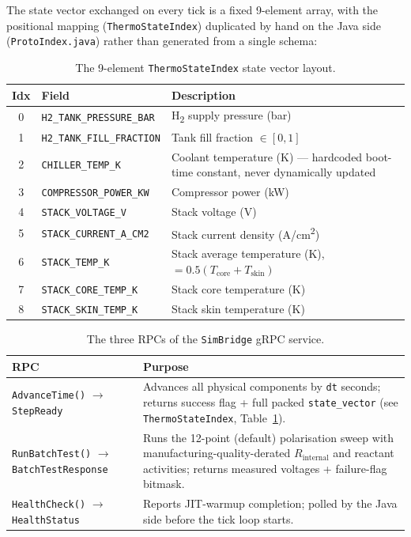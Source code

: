 \documentclass[twocolumn,10pt,a4paper]{article}
\newcommand{\code}[1]{\texttt{\small #1}}
\begin{document}
The state vector exchanged on every tick is a fixed 9-element array, with the positional mapping (\code{ThermoStateIndex}) duplicated by hand on the Java side (\code{ProtoIndex.java}) rather than generated from a single schema:

\begin{table}[t]
\centering
\small
\begin{tabular}{@{}clp{11.5cm}@{}}
\toprule
\textbf{Idx} & \textbf{Field} & \textbf{Description} \\
\midrule
0 & \code{H2\_TANK\_PRESSURE\_BAR} & H\textsubscript{2} supply pressure (bar) \\
1 & \code{H2\_TANK\_FILL\_FRACTION} & Tank fill fraction $\in [0,1]$ \\
2 & \code{CHILLER\_TEMP\_K} & Coolant temperature (K) --- hardcoded boot-time constant, never dynamically updated \\
3 & \code{COMPRESSOR\_POWER\_KW} & Compressor power (kW) \\
4 & \code{STACK\_VOLTAGE\_V} & Stack voltage (V) \\
5 & \code{STACK\_CURRENT\_A\_CM2} & Stack current density (A/cm\textsuperscript{2}) \\
6 & \code{STACK\_TEMP\_K} & Stack average temperature (K), $= 0.5(T_{\text{core}}+T_{\text{skin}})$ \\
7 & \code{STACK\_CORE\_TEMP\_K} & Stack core temperature (K) \\
8 & \code{STACK\_SKIN\_TEMP\_K} & Stack skin temperature (K) \\
\bottomrule
\end{tabular}
\caption{The 9-element \code{ThermoStateIndex} state vector layout.}
\label{tab:thermoindex}
\end{table}

\begin{table}[t]
\centering
\small
\begin{tabular}{@{}p{3.6cm}p{12.9cm}@{}}
\toprule
\textbf{RPC} & \textbf{Purpose} \\
\midrule
\code{AdvanceTime()} $\to$ \code{StepReady} & Advances all physical components by \code{dt} seconds; returns success flag + full packed \code{state\_vector} (see \code{ThermoStateIndex}, Table~\ref{tab:thermoindex}). \\
\code{RunBatchTest()} $\to$ \code{BatchTestResponse} & Runs the 12-point (default) polarisation sweep with manufacturing-quality-derated $R_{\text{internal}}$ and reactant activities; returns measured voltages + failure-flag bitmask. \\
\code{HealthCheck()} $\to$ \code{HealthStatus} & Reports JIT-warmup completion; polled by the Java side before the tick loop starts. \\
\bottomrule
\end{tabular}
\caption{The three RPCs of the \code{SimBridge} gRPC service.}
\label{tab:proto}
\end{table}
\end{document}
